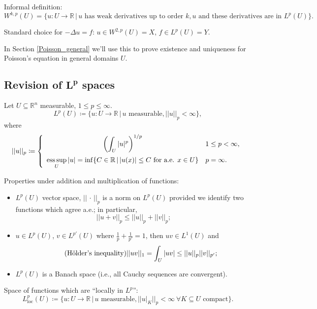 \documentclass[12pt]{article}
\DeclareMathOperator*{\esssup}{ess\,sup}
\theoremstyle{definition}
\begin{document}
Informal definition:
\[W^{k,p}(U)=\{u:U\rightarrow\mathbb{R}\,|\,u\text{ has weak derivatives up to order }k,u\text{ and these derivatives are in }L^p(U)\}.\]

Standard choice for $-\Delta u=f$: $u\in W^{2,p}(U)=X$, $f\in L^p(U)=Y$.

In Section \ref{Poisson_general} we'll use this to prove existence and uniqueness for Poisson's equation in general domains $U$.

\setcounter{subsection}{-1}
\subsection[Revision of \texorpdfstring{$L^p$}{L\textasciicircum p} spaces]{Revision of \texorpdfstring{$\boldsymbol{L^p}$}{L\textasciicircum p} spaces}
Let $U\subseteq\mathbb{R}^n$ measurable, $1\leq p\leq\infty$.
\[L^p(U)\coloneqq\{u:U\rightarrow\mathbb{R}\,|\,u\text{ measurable},||u||_p<\infty\},\]
where
\[||u||_p\coloneqq\left\{\begin{array}{cl}\displaystyle{\left(\int_U|u|^p\right)^{1/p}}&1\leq p<\infty,\vspace{2mm}\\\displaystyle{\esssup_U|u|=\inf\{C\in\mathbb{R}\,|\,|u(x)|\leq C\text{ for a.e. }x\in U\}}&p=\infty.\end{array}\right.\]

Properties under addition and multiplication of functions:
\begin{itemize}
\item $L^p(U)$ vector space, $||\,\cdot\,||_p$ is a norm on $L^p(U)$ provided we identify two functions which agree a.e.; in particular,
\begin{equation}\tag{Minkowski's inequality}
||u+v||_p\leq||u||_p+||v||_p;
\end{equation}
\item $u\in L^p(U)$, $v\in L^{p'}(U)$ where $\frac{1}{p}+\frac{1}{p'}=1$, then $uv\in L^1(U)$ and
\begin{equation}\tag{H\"{o}lder's inequality}
||uv||_1=\int_U|uv|\leq||u||_p||v||_{p'};
\end{equation}
\item $L^p(U)$ is a Banach space (i.e., all Cauchy sequences are convergent).
\end{itemize}

Space of functions which are ``locally in $L^p$'':
\[L_{\text{loc}}^p(U)\coloneqq\big\{u:U\rightarrow\mathbb{R}\,\big|\,u\text{ measurable},\big|\big|u|_K\big|\big|_p<\infty\ \forall K\subseteq U\text{ compact}\big\}.\]
\end{document}
